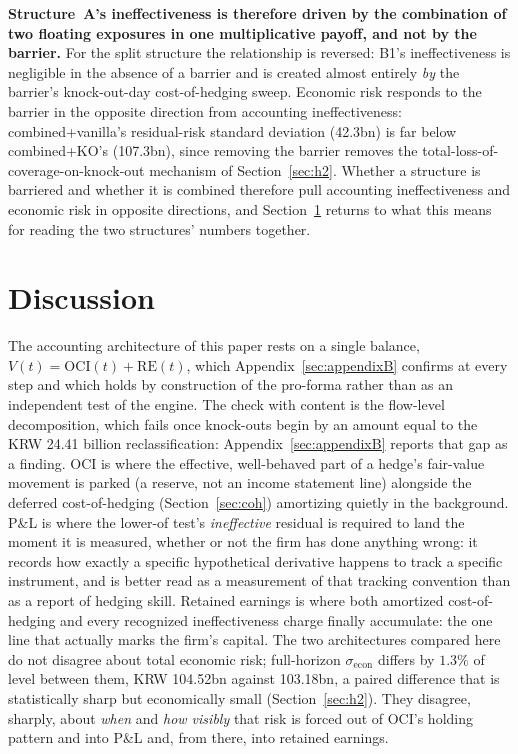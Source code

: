 \documentclass[11pt,a4paper]{article}
\begin{document}
\textbf{Structure~A's ineffectiveness is therefore driven by the combination of two floating exposures in one multiplicative payoff, and not by the barrier.} For the split structure the relationship is reversed: B1's ineffectiveness is negligible in the absence of a barrier and is created almost entirely \emph{by} the barrier's knock-out-day cost-of-hedging sweep. Economic risk responds to the barrier in the opposite direction from accounting ineffectiveness: combined+vanilla's residual-risk standard deviation (42.3bn) is far below combined+KO's (107.3bn), since removing the barrier removes the total-loss-of-coverage-on-knock-out mechanism of Section~\ref{sec:h2}. Whether a structure is barriered and whether it is combined therefore pull accounting ineffectiveness and economic risk in opposite directions, and Section~\ref{sec:discussion} returns to what this means for reading the two structures' numbers together.

\section{Discussion}
\label{sec:discussion}

The accounting architecture of this paper rests on a single balance, $V(t)=\mathrm{OCI}(t)+\mathrm{RE}(t)$, which Appendix~\ref{sec:appendixB} confirms at every step and which holds by construction of the pro-forma rather than as an independent test of the engine. The check with content is the flow-level decomposition, which fails once knock-outs begin by an amount equal to the KRW 24.41 billion reclassification: Appendix~\ref{sec:appendixB} reports that gap as a finding. OCI is where the effective, well-behaved part of a hedge's fair-value movement is parked (a reserve, not an income statement line) alongside the deferred cost-of-hedging (Section~\ref{sec:coh}) amortizing quietly in the background. P\&L is where the lower-of test's \emph{ineffective} residual is required to land the moment it is measured, whether or not the firm has done anything wrong: it records how exactly a specific hypothetical derivative happens to track a specific instrument, and is better read as a measurement of that tracking convention than as a report of hedging skill. Retained earnings is where both amortized cost-of-hedging and every recognized ineffectiveness charge finally accumulate: the one line that actually marks the firm's capital. The two architectures compared here do not disagree about total economic risk; full-horizon $\sigma_{\mathrm{econ}}$ differs by $1.3\%$ of level between them, KRW 104.52bn against 103.18bn, a paired difference that is statistically sharp but economically small (Section~\ref{sec:h2}). They disagree, sharply, about \emph{when} and \emph{how visibly} that risk is forced out of OCI's holding pattern and into P\&L and, from there, into retained earnings.
\end{document}
